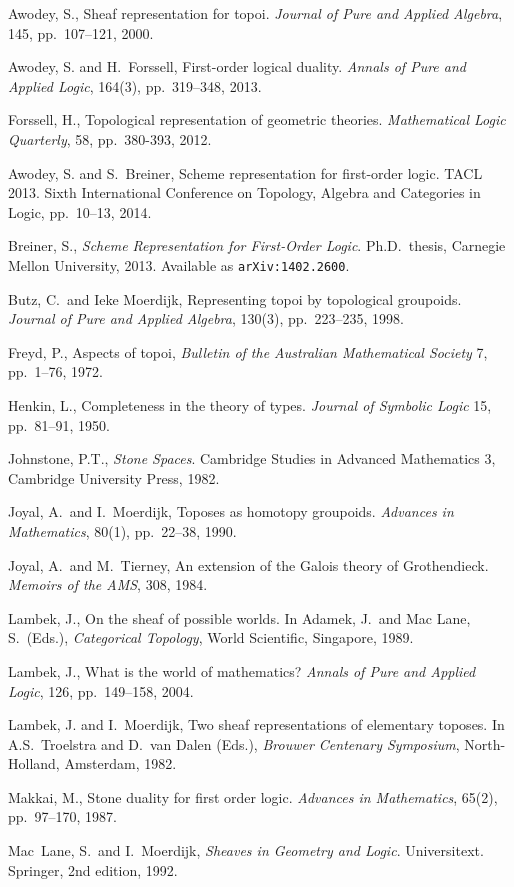 \documentclass[graybox]{svmult}
\begin{document}
\begin{thebibliography}{99.}

Awodey, S., Sheaf representation for topoi. 
\emph{Journal of Pure and Applied Algebra}, 145, pp.~107--121, 2000.

Awodey, S. and H.~Forssell, First-order logical duality. 
\emph{Annals of Pure and Applied Logic}, 164(3), pp.~319--348, 2013.

Forssell, H., Topological representation of geometric theories. 
\emph{Mathematical Logic Quarterly}, 58, pp.~380-393, 2012.

Awodey, S. and S.~Breiner, Scheme representation for first-order logic.
TACL 2013. Sixth International Conference on Topology, Algebra and Categories in Logic,
pp.~10--13, 2014.

Breiner, S., \emph{Scheme Representation for First-Order Logic}. 
Ph.D.~thesis, Carnegie Mellon University, 2013.  Available as {\tt arXiv:1402.2600}.

Butz, C.\ and Ieke Moerdijk, Representing topoi by topological groupoids. 
\emph{Journal of Pure and Applied Algebra}, 130(3), pp.~223--235, 1998.

Freyd, P., Aspects of topoi, 
\emph{Bulletin of the Australian Mathematical Society} 7, pp.~1--76, 1972.
 
Henkin, L., Completeness in the theory of types. 
\emph{Journal of Symbolic Logic} 15, pp.~81--91, 1950.

Johnstone, P.T., \emph{Stone Spaces}. Cambridge Studies in Advanced Mathematics 3,
Cambridge University Press, 1982.

  Joyal, A.\ and I.~Moerdijk, Toposes as homotopy groupoids. 
\emph{Advances in Mathematics}, 80(1), pp.~22--38, 1990.

  Joyal, A.\  and M.\ Tierney, An extension of the Galois theory of Grothendieck.
\emph{Memoirs of the AMS}, 308, 1984.

Lambek, J., On the sheaf of possible worlds. 
In Adamek, J.\ and  Mac Lane, S.\ (Eds.), \emph{Categorical Topology}, World Scientific, Singapore, 1989.

 Lambek, J., What is the world of mathematics? 
\emph{Annals of Pure and Applied Logic}, 126, pp.~149--158, 2004.

Lambek, J. and I.~Moerdijk, Two sheaf representations of elementary toposes. 
In A.S.\ Troelstra and D.\ van Dalen (Eds.), \emph{Brouwer Centenary Symposium}, North-Holland, Amsterdam, 1982.
 
 Makkai, M., Stone duality for first order logic. 
 \emph{Advances in Mathematics}, 65(2), pp.~97--170,  1987.
 
Mac~Lane, S.\ and I.~Moerdijk, \emph{Sheaves in Geometry and Logic}. Universitext. Springer, 2nd edition, 1992.

\end{thebibliography}



\end{document}
